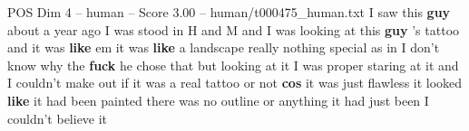 \begin{textsample}{POS Dim 4 – human – Score 3.00 – human/t000475\_human.txt}  \label{ex:f4_pos_015}
I saw this \textbf{guy} about a year ago I was stood in H and M and I was looking at this \textbf{guy} 's tattoo and it was \textbf{like} em it was \textbf{like} a landscape really nothing special as in I don't know why the \textbf{fuck} he chose that but looking at it I was proper staring at it and I couldn't make out if it was a real tattoo or not \textbf{cos} it was just flawless it looked \textbf{like} it had been painted there was no outline or anything it had just been I couldn't believe it

\end{textsample}
